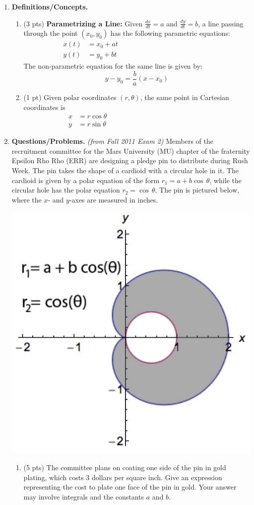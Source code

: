 \documentclass[11pt,letterpaper]{article}
\begin{document}
\begin{enumerate}
\item  \textbf{Definitions/Concepts.}
\begin{enumerate}
\item (3 pts) {\bf Parametrizing a Line:} Given $\frac{dx}{dt}=a$ and $\frac{dy}{dt}=b$, a line passing through the point $(x_0,y_0)$ has the following parametric equations:
\begin{align*}
x(t) &= x_0+at\hspace{160pt}\\
y(t) &= y_0+bt
\end{align*}
The non-parametric equation for the same line is given by:
\[y-y_0=\frac{b}{a}(x-x_0)\]
\item (1 pt) Given polar coordinates $(r,\theta)$, the same point in Cartesian coordinates is 
\begin{align*}
x &= r\cos\theta\hspace{170pt}\\
y &= r\sin\theta
\end{align*}
\end{enumerate}

 
\item \textbf{Questions/Problems.} {\it (from Fall 2011 Exam 2)} Members of the recruitment committee for the Mars University (MU) chapter of the fraternity Epsilon Rho Rho (ERR) are designing a pledge pin to distribute during Rush Week.  The pin takes the shape of a cardioid with a circular hole in it.  The cardioid is given by a polar equation of the form $r_1=a+b\cos\,\theta$, while the circular hole has the polar equation $r_2=\cos\,\theta$.  The pin is pictured below, where the $x$- and $y$-axes are measured in inches.
\smallskip
\begin{center}
\includegraphics[width=.35\textwidth]{quiz6pic.png}
\end{center}
\begin{enumerate}
\item (5 pts) The committee plans on coating one side of the pin in gold plating, which costs 3 dollars per square inch.  Give an expression representing the cost to plate one face of the pin in gold.  Your answer may involve integrals and the constants $a$ and $b$.


\end{enumerate}
\end{enumerate}
\end{document}
